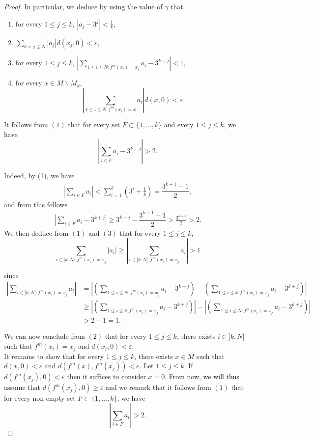 \documentclass[12pt,english]{amsart}
\numberwithin{equation}{section}
\theoremstyle{plain}
\theoremstyle{definition}
\begin{document}
\begin{proof}
In particular, we deduce by using the value of $\gamma$ that
\begin{enumerate}
\item for every $1\le j\le k$, $\displaystyle |a_j-3^j|<\frac{1}{k}$,
\item  $\displaystyle \sum_{k< j\le N}|a_j|d(x_j,0)<\varepsilon$,
\item for every $1\le j\le k$, $\displaystyle\left|\sum_{1\le i\le N:f^m(x_i)=x_j}a_i-3^{k+j}\right|<1$,
\item for every $x\in M\backslash M_k$,
\[\displaystyle\left|\sum_{1\le i\le N:f^m(x_i)=x}a_i\right| d(x,0)<\varepsilon.\]
\end{enumerate}
It follows from $(1)$ that for every set $F\subset \{1,\dots,k\}$ and every $1\le j\le k$, we have
\[\left|\sum_{i\in F} a_i-3^{k+j}\right|> 2.\]

Indeed, by (1), we have
\begin{align*}
     \left|\sum_{i\in F}a_i\right| < \sum_{i=1}^k\left(3^i+\frac{1}{k}\right)= \dfrac{3^{k+1}-1}{2},
\end{align*}
and from this follows
\begin{align*}
    \left|\sum_{i\in F} a_i-3^{k+j}\right | \geq 3^{k+j}-\dfrac{3^{k+1}-1}{2} >\frac{3^{k+1}}{2}> 2.
\end{align*}
We then deduce from $(1)$ and $(3)$ that for every $1\le j\le k$, 
\[\sum_{i\in ]k,N]:f^m(x_i)=x_j}|a_i|\ge \left|\sum_{i\in ]k,N]:f^m(x_i)=x_j}a_i\right|>1\]

since
\begin{align*}
\left|\sum_{i\in ]k,N]:f^m(x_i)=x_j}a_i\right|&=\left|\left(\sum_{1\le i\le N:f^m(x_i)=x_j}a_i-3^{k+j}\right)-\left(\sum_{1\le i\le k:f^m(x_i)=x_j}a_i-3^{k+j}\right) \right|\\
&\ge \left|\left(\sum_{1\le i\le k:f^m(x_i)=x_j}a_i-3^{k+j}\right) \right|-\left|\left(\sum_{1\le i\le N:f^m(x_i)=x_j}a_i-3^{k+j}\right)\right|\\
&>2-1=1.
\end{align*}


We can now conclude from $(2)$ that for every $1\le j\le k$, there exists $i\in ]k,N]$ such that $f^m(x_i)=x_j$ and $d(x_i,0)<\varepsilon$.\\

It remains to show that for every $1\le j\le k$, there exists $x\in M$ such that $d(x,0)<\varepsilon$  and $d(f^m(x),f^m(x_j))<\varepsilon$.  
Let $1\le j\le k$. 
If $d(f^m(x_j),0)<\varepsilon$ then it suffices to consider $x=0$. From now, we will thus assume that $d(f^m(x_j),0)\ge \varepsilon$ and we remark that it follows from $(1)$ that for every non-empty set $F\subset \{1,\dots,k\}$, we have
\begin{equation}\label{eq_coeff}
    \left|\sum_{i\in F}a_i\right|> 2.
\end{equation}


\end{proof}
\end{document}

